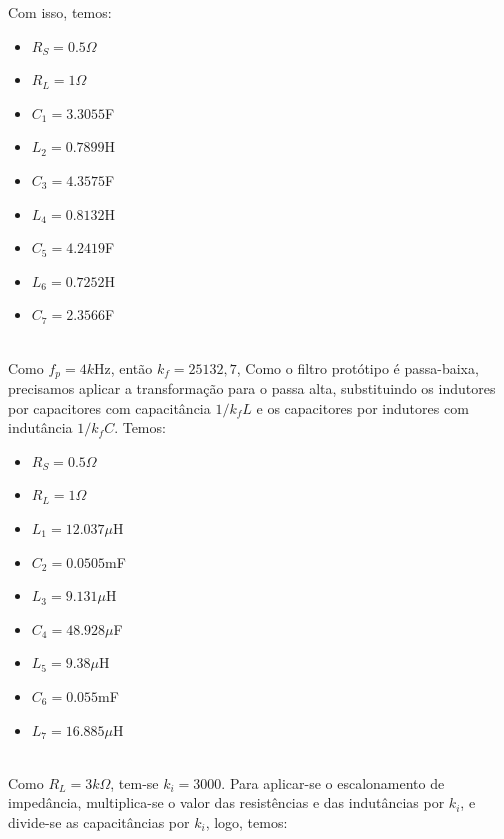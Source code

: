 \documentclass[14pt, oneside]{book}
\newcommand\tab[1][1cm]{\hspace*{#1}}
\theoremstyle{definition}
\begin{document}
            \tab Com isso, temos:
             
            \begin{itemize}
                \item $R_S = 0.5\Omega$
                \item $R_L = 1\Omega$
                \item $C_1 = 3.3055$F
                \item $L_2 =0.7899$H
                \item $C_3 = 4.3575$F
                \item $L_4 = 0.8132$H
                \item $C_5 = 4.2419$F
                \item $L_6 = 0.7252$H
                \item $C_7 = 2.3566$F
            \end{itemize}\\
             
            \tab Como $f_p = 4k$Hz, então $k_f = 25132,7$, Como o filtro protótipo é passa-baixa, precisamos aplicar a transformação para o passa alta, substituindo os indutores por capacitores com capacitância $1/k_fL$ e os capacitores por indutores com indutância $1/k_fC$. Temos:
            
            \begin{itemize}
                \item $R_S = 0.5\Omega$
                \item $R_L = 1\Omega$
                \item $L_1 = 12.037\mu$H
                \item $C_2 =0.0505$mF
                \item $L_3 = 9.131\mu$H
                \item $C_4 = 48.928\mu$F
                \item $L_5 = 9.38\mu$H
                \item $C_6 = 0.055$mF
                \item $L_7 = 16.885\mu$H
            \end{itemize}\\
            
            \tab Como $R_L = 3k\Omega$, tem-se $k_i = 3000$. Para aplicar-se o escalonamento de impedância, multiplica-se o valor das resistências e das indutâncias por $k_i$, e divide-se as capacitâncias por $k_i$, logo, temos:
            
\end{document}

